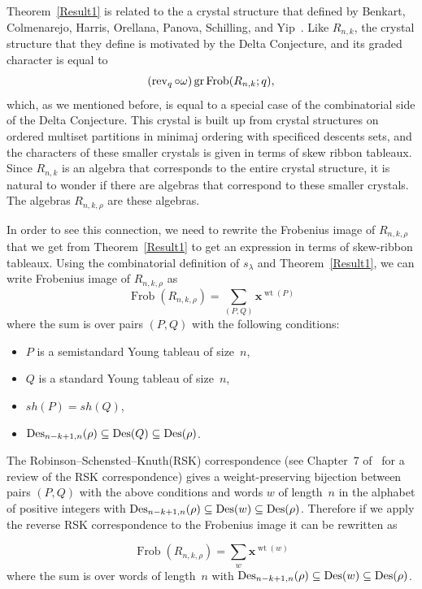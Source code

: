 \documentclass[10pt]{article}
\newcommand{\Frob}{\operatorname{Frob}}\newcommand{\gr}{\operatorname{gr}}
\newcommand{\wt}{\operatorname{wt}}\newcommand{\SYT}{\operatorname{SYT}}\newcommand{\SSYT}{\operatorname{SSYT}}
\begin{document}
Theorem~\ref{Result1} is related to the a crystal structure that defined by Benkart, Colmenarejo, Harris, Orellana, Panova, 
Schilling, and Yip~\cite{Sh}. Like $R_{n,k}$, the crystal structure that they define is motivated by the Delta Conjecture, and 
its graded character is equal to 
\begin{equation}
(\rev _q\circ \omega) \gr\Frob (R_{n,k};q),
\end{equation}
 which, as we 
mentioned before, is equal to a special case of the combinatorial side of the Delta Conjecture. This crystal is built up from 
crystal structures on ordered multiset partitions in minimaj ordering with specificed descents sets, and the characters of 
these smaller crystals is given in terms of skew ribbon tableaux. Since $R_{n,k}$ is an algebra that corresponds to the entire 
crystal structure, it is natural to wonder if there are algebras that correspond to these smaller crystals. The algebras 
$R_{n,k,\rho}$ are these algebras.


In order to see this connection, we need to rewrite the Frobenius image of $R_{n,k,\rho}$ that we get from Theorem~\ref{Result1} to get an expression in terms of skew-ribbon tableaux. Using the combinatorial definition of $s_\lambda$ and 
Theorem~\ref{Result1}, we can write Frobenius image of $R_{n,k,\rho}$ as 
\begin{equation}
\Frob (R_{n,k,\rho})=\sum_{(P,Q)} \mathbf{x}^{\wt (P)}
\end{equation}
 where the sum is over pairs $(P,Q)$ 
with the following conditions:
\begin{itemize}
\item $P$ is a semistandard Young tableau of size~$n$,
\item $Q$ is a standard Young tableau of size~$n$,
\item $sh(P)=sh(Q)$,
\item $\operatorname{Des} _{n-k+1,n}(\rho)\subseteq \operatorname{Des} (Q)\subseteq \operatorname{Des} (\rho)$.
\end{itemize} 

The Robinson--Schensted--Knuth(RSK) correspondence (see Chapter~7 of~\cite{St} for a review of the RSK correspondence) gives a 
weight-preserving bijection between pairs $(P,Q)$ with the above conditions and words $w$ of length~$n$ in the alphabet of 
positive integers with $\operatorname{Des} _{n-k+1,n}(\rho)\subseteq \operatorname{Des} (w)\subseteq \operatorname{Des} (\rho)$. Therefore if we apply the reverse RSK 
correspondence to the Frobenius image it can be rewritten as
 
\begin{equation}
\Frob (R_{n,k,\rho})=\sum_{w} \mathbf{x}^{\wt (w)}
\end{equation}
 where the sum is over words of length~$n$ 
with $\operatorname{Des} _{n-k+1,n}(\rho)\subseteq \operatorname{Des} (w)\subseteq \operatorname{Des} (\rho)$.
\end{document}
